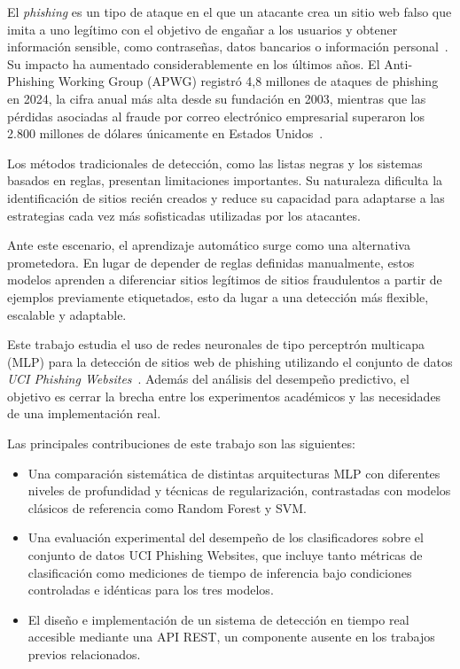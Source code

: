 \documentclass[conference]{IEEEtran}
\begin{document}
El \textit{phishing} es un tipo de ataque en el que un atacante crea un sitio web falso que imita a uno legítimo con el objetivo de engañar a los usuarios y obtener información sensible, como contraseñas, datos bancarios o información personal~\cite{mohammad2012}. Su impacto ha aumentado considerablemente en los últimos años. El Anti-Phishing Working Group (APWG) registró 4,8 millones de ataques de phishing en 2024, la cifra anual más alta desde su fundación en 2003, mientras que las pérdidas asociadas al fraude por correo electrónico empresarial superaron los 2.800 millones de dólares únicamente en Estados Unidos~\cite{apwg2024q4}.

Los métodos tradicionales de detección, como las listas negras y los sistemas basados en reglas, presentan limitaciones importantes. Su naturaleza dificulta la identificación de sitios recién creados y reduce su capacidad para adaptarse a las estrategias cada vez más sofisticadas utilizadas por los atacantes.

Ante este escenario, el aprendizaje automático surge como una alternativa prometedora. En lugar de depender de reglas definidas manualmente, estos modelos aprenden a diferenciar sitios legítimos de sitios fraudulentos a partir de ejemplos previamente etiquetados, esto da lugar a una detección más flexible, escalable y adaptable.

Este trabajo estudia el uso de redes neuronales de tipo perceptrón multicapa (MLP) para la detección de sitios web de phishing utilizando el conjunto de datos \textit{UCI Phishing Websites}~\cite{uci327}. Además del análisis del desempeño predictivo, el objetivo es cerrar la brecha entre los experimentos académicos y las necesidades de una implementación real.

Las principales contribuciones de este trabajo son las siguientes:

\begin{itemize}
    \item Una comparación sistemática de distintas arquitecturas MLP con diferentes niveles de profundidad y técnicas de regularización, contrastadas con modelos clásicos de referencia como Random Forest y SVM.

    \item Una evaluación experimental del desempeño de los clasificadores sobre el conjunto de datos UCI Phishing Websites, que incluye tanto métricas de clasificación como mediciones de tiempo de inferencia bajo condiciones controladas e idénticas para los tres modelos.

    \item El diseño e implementación de un sistema de detección en tiempo real accesible mediante una API REST, un componente ausente en los trabajos previos relacionados.
\end{itemize}
\end{document}

